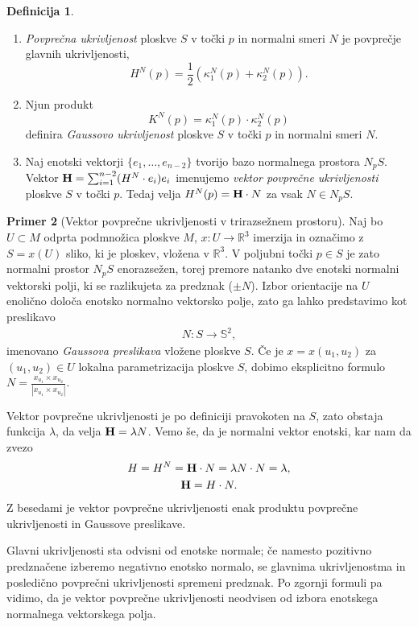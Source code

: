 \documentclass[12pt,a4paper,twoside]{article}
\theoremstyle{definition} %
\newtheorem{definicija}{Definicija}[section]
\newtheorem{primer}[definicija]{Primer}
\theoremstyle{plain} %
\numberwithin{equation}{section}  %
\begin{document}
\begin{definicija}
\begin{enumerate}
\item
\emph{Povprečna ukrivljenost} ploskve $S$ v točki $p$ in normalni smeri $N$ je povprečje glavnih ukrivljenosti,
\begin{equation} \label{eq:povp-ukr}
H^{N}(p) = \frac{1}{2} \left(\kappa _{1}^{N}(p) + \kappa _{2}^{N}(p) \right).
\end{equation}
\item
Njun produkt 
\begin{equation} \label{eq:Gauss-ukr}
K^{N}(p) = \kappa _{1}^{N}(p) \cdot \kappa _{2}^{N}(p)
\end{equation}
definira \emph{Gaussovo ukrivljenost} ploskve $S$ v točki $p$ in normalni smeri $N$.
\item
Naj enotski vektorji $\{ e_{1}, \dots , e_{n-2} \}$ tvorijo bazo normalnega prostora $N_{p}S$. Vektor $\textbf{\textup{H}} = \sum_{i=1}^{n-2} (H^{N} \cdot e_{i}) e_{i}$ imenujemo \emph{vektor povprečne ukrivljenosti} ploskve $S$ v točki $p$. Tedaj velja $H^{N}(p) = \textbf{\textup{H}} \cdot N$ za vsak $N \in N_{p}S$.
\end{enumerate}
\end{definicija}

\begin{primer}[Vektor povprečne ukrivljenosti v trirazsežnem prostoru]
Naj bo $U \subset M$ odprta podmnožica ploskve $M$, $x \colon U \to \mathbb{R}^{3}$ imerzija in označimo z $S = x(U)$ sliko, ki je ploskev, vložena v $\mathbb{R}^3$. V poljubni točki $p \in S$ je zato normalni prostor $N_{p}S$ enorazsežen, torej premore natanko dve enotski normalni vektorski polji, ki se razlikujeta za predznak ($\pm N$). Izbor orientacije na $U$ enolično določa enotsko normalno vektorsko polje, zato ga lahko predstavimo kot preslikavo
\begin{gather*}
N \colon S \to \mathbb{S}^{2},
\end{gather*}
imenovano \emph{Gaussova preslikava} vložene ploskve $S$. Če je $x = x(u_{1},u_{2})$ za $(u_{1},u_{2}) \in U$ lokalna parametrizacija ploskve $S$, dobimo eksplicitno formulo $N = \frac{x_{u_{1}} \times x_{u_{2}}}{|x_{u_{1}} \times x_{u_{2}}|}$.

Vektor povprečne ukrivljenosti je po definiciji pravokoten na $S$, zato obstaja funkcija $\lambda$, da velja $\textbf{\textup{H}} = \lambda N$. Vemo še, da je normalni vektor enotski, kar nam da zvezo
\begin{gather}
H = H^{N} = \textbf{\textup{H}} \cdot N = \lambda N \cdot N = \lambda, \nonumber \\
\textbf{\textup{H}} = H \cdot N.
\end{gather}
Z besedami je vektor povprečne ukrivljenosti enak produktu povprečne ukrivljenosti in Gaussove preslikave.

Glavni ukrivljenosti sta odvisni od enotske normale; če namesto pozitivno predznačene izberemo negativno enotsko normalo, se glavnima ukrivljenostma in posledično povprečni ukrivljenosti spremeni predznak. Po zgornji formuli pa vidimo, da je vektor povprečne ukrivljenosti neodvisen od izbora enotskega normalnega vektorskega polja.
\end{primer}
\end{document}
